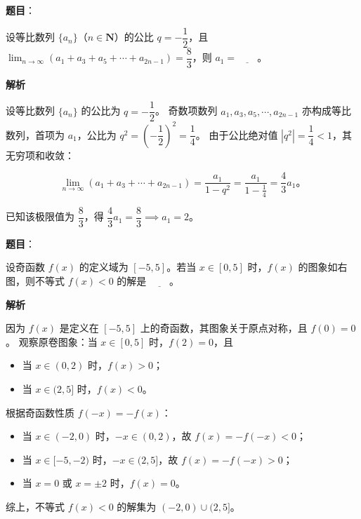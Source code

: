 \begin{answer}

\textbf{题目}：

设等比数列 $\{a_n\}$（$n \in \mathbf{N}$）的公比 $q = -\dfrac{1}{2}$，且 $\displaystyle\lim_{n\to\infty}(a_1 + a_3 + a_5 + \cdots + a_{2n-1}) = \dfrac{8}{3}$，则 $a_1 = \underline{\qquad}$。

\textbf{解析}

设等比数列 $\{a_n\}$ 的公比为 $q = -\dfrac{1}{2}$。
奇数项数列 $a_1, a_3, a_5, \cdots, a_{2n-1}$ 亦构成等比数列，首项为 $a_1$，公比为 $q^2 = \left(-\dfrac{1}{2}\right)^2 = \dfrac{1}{4}$。
由于公比绝对值 $|q^2| = \dfrac{1}{4} < 1$，其无穷项和收敛：

\nopagebreak[4]
\[
\lim_{n\to\infty}(a_1 + a_3 + \cdots + a_{2n-1}) = \dfrac{a_1}{1 - q^2} = \dfrac{a_1}{1 - \frac{1}{4}} = \dfrac{4}{3}a_1\mbox{。}
\]

已知该极限值为 $\dfrac{8}{3}$，得 $\dfrac{4}{3}a_1 = \dfrac{8}{3} \implies a_1 = 2$。


\end{answer}
\begin{answer}

\textbf{题目}：

设奇函数 $f(x)$ 的定义域为 $[-5, 5]$。若当 $x \in [0, 5]$ 时，$f(x)$ 的图象如右图，则不等式 $f(x) < 0$ 的解是 $\underline{\qquad}$。
\nopagebreak[4]
\begin{center}\end{center}
\nopagebreak[4]
\textbf{解析}

因为 $f(x)$ 是定义在 $[-5, 5]$ 上的奇函数，其图象关于原点对称，且 $f(0) = 0$。
观察原卷图象：当 $x \in [0, 5]$ 时，$f(2) = 0$，且
\begin{itemize}
\item 当 $x \in (0, 2)$ 时，$f(x) > 0$；
\item 当 $x \in (2, 5]$ 时，$f(x) < 0$。
\end{itemize}

根据奇函数性质 $f(-x) = -f(x)$：
\begin{itemize}
\item 当 $x \in (-2, 0)$ 时，$-x \in (0, 2)$，故 $f(x) = -f(-x) < 0$；
\item 当 $x \in [-5, -2)$ 时，$-x \in (2, 5]$，故 $f(x) = -f(-x) > 0$；
\item 当 $x = 0$ 或 $x = \pm 2$ 时，$f(x) = 0$。
\end{itemize}

综上，不等式 $f(x) < 0$ 的解集为 $(-2, 0) \cup (2, 5]$。

\gkanswer{答案：$(-2, 0) \cup (2, 5]$}

\end{answer}
